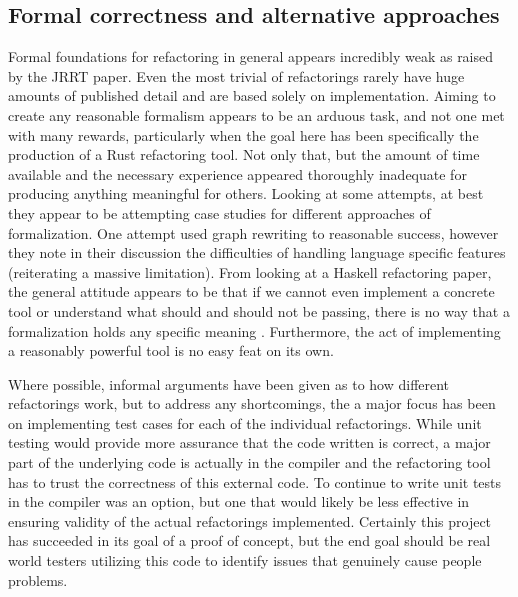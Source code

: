 
\subsection{Formal correctness and alternative approaches}
Formal foundations for refactoring in general appears incredibly weak as raised by the JRRT paper. Even the most trivial of refactorings rarely have huge amounts of published detail and are based solely on implementation. Aiming to create any reasonable formalism appears to be an arduous task, and not one met with many rewards, particularly when the goal here has been specifically the production of a Rust refactoring tool. Not only that, but the amount of time available and the necessary experience appeared thoroughly inadequate for producing anything meaningful for others. Looking at some attempts, at best they appear to be attempting case studies for different approaches of formalization. One attempt used graph rewriting \cite{graph} to reasonable success, however they note in their discussion the difficulties of handling language specific features (reiterating a massive limitation). From looking at a Haskell refactoring paper, the general attitude appears to be that if we cannot even implement a concrete tool or understand what should and should not be passing, there is no way that a formalization holds any specific meaning \cite{sculthorpe}. Furthermore, the act of implementing a reasonably powerful tool is no easy feat on its own. 


Where possible, informal arguments have been given as to how different refactorings work, but to address any shortcomings, the a major focus has been on implementing test cases for each of the individual refactorings. While unit testing would provide more assurance that the code written is correct, a major part of the underlying code is actually in the compiler and the refactoring tool has to trust the correctness of this external code. To continue to write unit tests in the compiler was an option, but one that would likely be less effective in ensuring validity of the actual refactorings implemented. Certainly this project has succeeded in its goal of a proof of concept, but the end goal should be real world testers utilizing this code to identify issues that genuinely cause people problems.

